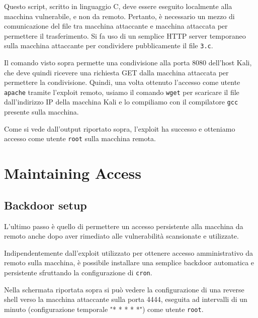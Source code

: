 \documentclass[12pt, a4paper]{article}
\begin{document}
	Questo script, scritto in linguaggio C, deve essere eseguito localmente alla macchina vulnerabile, e non da remoto. Pertanto, è necessario un mezzo di comunicazione del file tra macchina attaccante e macchina attaccata per permettere il trasferimento. Si fa uso di un semplice HTTP server temporaneo sulla macchina attaccante per condividere pubblicamente il file \texttt{3.c}.
	
	
	Il comando visto sopra permette una condivisione alla porta 8080 dell'host Kali, che deve quindi ricevere una richiesta GET dalla macchina attaccata per permettere la condivisione.
	Quindi, una volta ottenuto l'accesso come utente \texttt{apache} tramite l'exploit remoto, usiamo il comando \texttt{wget} per scaricare il file dall'indirizzo IP della macchina Kali e lo compiliamo con il compilatore \texttt{gcc} presente sulla macchina.
	
	
	Come si vede dall'output riportato sopra, l'exploit ha successo e otteniamo accesso come utente \texttt{root} sulla macchina remota.
	
	\newpage
	\section{Maintaining Access}
	\subsection{Backdoor setup}
	L'ultimo passo è quello di permettere un accesso persistente alla macchina da remoto anche dopo aver rimediato alle vulnerabilità scansionate e utilizzate.
	
	Indipendentemente dall'exploit utilizzato per ottenere accesso amministrativo da remoto sulla macchina, è possibile installare una semplice backdoor automatica e persistente sfruttando la configurazione di \texttt{cron}.
	
	
	Nella schermata riportata sopra si può vedere la configurazione di una reverse shell verso la macchina attaccante sulla porta 4444, eseguita ad intervalli di un minuto (configurazione temporale "* * * * *") come utente \texttt{root}.
	
\end{document}
